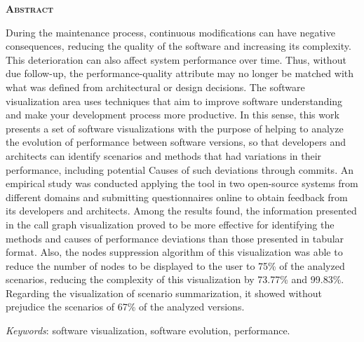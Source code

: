 \begin{center}
	{\Large{\textbf{\mscThesisEnglishTitle}}}
\end{center}

\vspace{1cm}


\vspace{1cm}

\begin{center}
	\Large{\textsc{\textbf{Abstract}}}
\end{center}

\noindent During the maintenance process, continuous modifications can have negative consequences, reducing the quality of the software and increasing its complexity. This deterioration can also affect system performance over time. Thus, without due follow-up, the performance-quality attribute may no longer be matched with what was defined from architectural or design decisions. The software visualization area uses techniques that aim to improve software understanding and make your development process more productive. In this sense, this work presents a set of software visualizations with the purpose of helping to analyze the evolution of performance between software versions, so that developers and architects can identify scenarios and methods that had variations in their performance, including potential Causes of such deviations through commits. An empirical study was conducted applying the tool in two open-source systems from different domains and submitting questionnaires online to obtain feedback from its developers and architects. Among the results found, the information presented in the call graph visualization proved to be more effective for identifying the methods and causes of performance deviations than those presented in tabular format. Also, the nodes suppression algorithm of this visualization was able to reduce the number of nodes to be displayed to the user to 75\% of the analyzed scenarios, reducing the complexity of this visualization by 73.77\% and 99.83\%. Regarding the visualization of scenario summarization, it showed without prejudice the scenarios of 67\% of the analyzed versions.

\noindent\textit{Keywords}: software visualization, software evolution, performance.